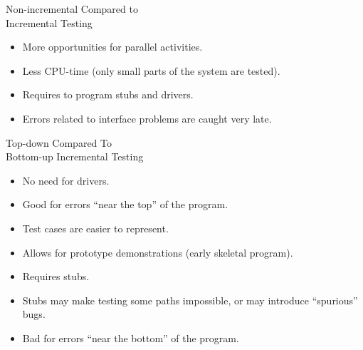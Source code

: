 \begin{Frame}{Non-incremental Compared to\\ Incremental Testing}
  \begin{itemize}
    \item[\goodmark] More opportunities for parallel activities.
    \item[\goodmark] Less CPU-time (only small parts of the system are tested).
  \end{itemize}

  \xxx

  \begin{itemize}
    \item[\badmark] Requires to program stubs and drivers.
    \item[\badmark] Errors related to interface problems are caught very late.
  \end{itemize}
\end{Frame}

\begin{Frame}{Top-down Compared To\\ Bottom-up Incremental Testing}
  \begin{itemize}
    \item[\goodmark] No need for drivers.
    \item[\goodmark] Good for errors \enquote{near the top} of the program.
    \item[\goodmark] Test cases are easier to represent.
    \item[\goodmark] Allows for prototype demonstrations (early skeletal program).
  \end{itemize}

  \xxx

  \begin{itemize}
    \item[\badmark] Requires stubs.
    \item[\badmark] Stubs may make testing some paths impossible, or may introduce \enquote{spurious} bugs.
    \item[\badmark] Bad for errors \enquote{near the bottom} of the program.
  \end{itemize}
\end{Frame}